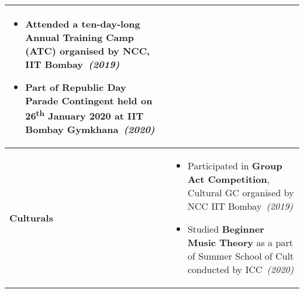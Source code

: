 \documentclass[10pt,a4paper,sans]{moderncv}        %
\newcommand{\rhsmall}[1]{\hfill{\footnotesize{\textsl{(#1)}}}}
\begin{document}
\begin{tabular}{p{0.99in}p{6.01in}}
\begin{itemize}
	\item Attended a ten-day-long \textbf{Annual Training Camp} (ATC) organised by NCC, IIT Bombay\ \rhsmall{2019}
	\item Part of \textbf{Republic Day Parade} Contingent held on 26\textsuperscript{th} January 2020 at IIT Bombay Gymkhana\ \rhsmall{2020}
\end{itemize}\\[-1em]\hline
\vspace{-0.5em}
\small\textbf{Culturals} & \vspace{-0.5em}
\begin{itemize}
	\item Participated in \textbf{Group Act Competition}, Cultural GC organised by NCC IIT Bombay\ \rhsmall{2019}
	\item Studied \textbf{Beginner Music Theory} as a part of Summer School of Cult conducted by ICC\ \rhsmall{2020}
\end{itemize}
\end{tabular}
\end{document}
